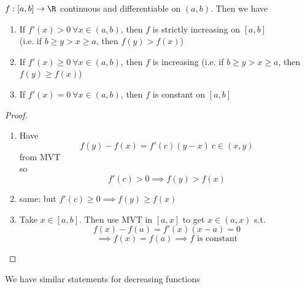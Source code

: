 \begin{cor}
$f: [a,b]\to \R $ continuous and differentiable on $(a,b)$. Then we have
\begin{enumerate}
    \item If $f'(x) > 0 \ \forall x \in (a,b)$, then $f$ is strictly increasing on $[a,b]$\\
    (i.e. if $b \geq y > x \geq a$, then $f(y) > f(x)$)
    \item If $f'(x)\geq 0 \ \forall x \in (a,b)$, then $f$ is increasing (i.e. if $b\geq y>x\geq a$, then $f(y)\geq f(x)$)
    \item If $f'(x) = 0 \ \forall x \in (a,b)$, then $f$ is constant on $[a,b]$
\end{enumerate}
\begin{proof}
\hfill{ }
\begin{enumerate}
    \item Have
    \[f(y) - f(x) = f'(c)(y-x) \ c\in (x,y)\]
    from MVT\\
    so
    \[f'(c)>0 \implies f(y) > f(x)\]
    \item same: but $f'(c)\geq 0 \implies f(y) \geq f(x)$
    \item Take $x\in [a,b]$. Then use MVT in $[a,x]$ to get $x\in (a,x)$ s.t.
    \[f(x) - f(a) = f'(x)(x-a) = 0\]
    \[\implies f(x) = f(a) \implies f\text{ is constant}\]
\end{enumerate}
\end{proof}
\begin{remark}
We have similar statements for decreasing functions
\end{remark}
\end{cor}
